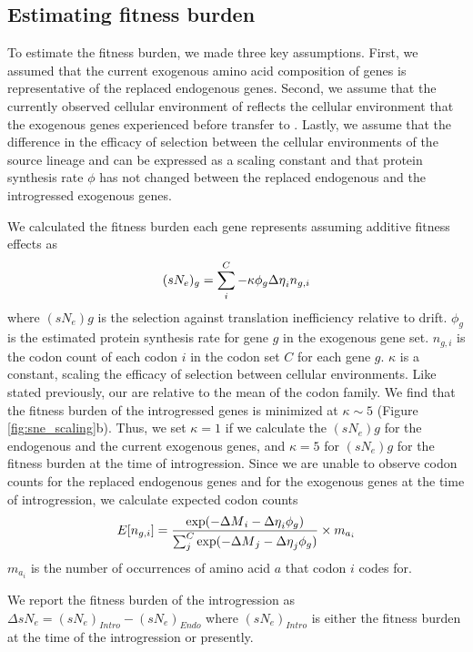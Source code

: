 \subsection{Estimating fitness burden}

To estimate the fitness burden, we made three key assumptions.
First, we assumed that the current exogenous amino acid composition of genes is representative of the replaced endogenous genes.
Second, we assume that the currently observed cellular environment of \gossypii reflects the cellular environment that the exogenous genes experienced before transfer to \kluyveri.
Lastly, we assume that the difference in the efficacy of selection between the cellular environments of the source lineage and \kluyveri can be expressed as a scaling constant and that protein synthesis rate $\phi$ has not changed between the replaced endogenous and the introgressed exogenous genes.

We calculated the fitness burden each gene represents assuming additive fitness effects as 
\begin{equation}
(sN_e)_g = \sum_i^{C} -\kappa \phi_g {\Delta \eta}_i n_{g,i} 
\end{equation}
where $(sN_e)g$ is the selection against translation inefficiency relative to drift.
$\phi_g$ is the estimated protein synthesis rate for gene $g$ in the exogenous gene set.
$n_{g,i}$ is the codon count of each codon $i$ in the codon set $C$ for each gene $g$.
$\kappa$ is a constant, scaling the efficacy of selection between cellular environments.
Like stated previously, our \DE are relative to the mean of the codon family.
We find that the fitness burden of the introgressed genes  is minimized at $\kappa \sim 5$ (Figure \ref{fig:sne_scaling}b).
Thus, we set $\kappa = 1$ if we calculate the $(sN_e)g$ for the endogenous and the current exogenous genes, and $\kappa = 5$ for $(sN_e)g$ for the fitness burden at the time of introgression.
Since we are unable to observe codon counts for the replaced endogenous genes and for the exogenous genes at the time of introgression, we calculate expected codon counts
\begin{equation}
E[n_{g,i}] = \frac{\exp(-{\Delta M}_i -{\Delta \eta}_i\phi_g)}{\sum_j^C \exp(-{\Delta M}_j -{\Delta \eta}_j\phi_g)}\times m_{a_i}
\end{equation} 
$m_{a_i}$ is the number of occurrences of amino acid $a$ that codon $i$ codes for.

We report the fitness burden of the introgression as $\Delta sN_e = (sN_e)_{Intro} - (sN_e)_{Endo}$ where $(sN_e)_{Intro}$ is either the fitness burden at the time of the introgression or presently.

